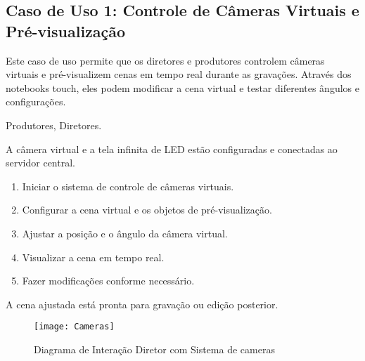 \subsection{Caso de Uso 1: Controle de Câmeras Virtuais e Pré-visualização}
\begin{description}[style=nextline]
    \item[Descrição:] Este caso de uso permite que os diretores e produtores controlem câmeras virtuais e pré-visualizem cenas em tempo real durante as gravações. Através dos notebooks touch, eles podem modificar a cena virtual e testar diferentes ângulos e configurações.
    
    \item[Atores:] Produtores, Diretores.
    
    \item[Pré-condição:] A câmera virtual e a tela infinita de LED estão configuradas e conectadas ao servidor central.
    
    \item[Sequência de Ações:]
    \begin{enumerate}
        \item Iniciar o sistema de controle de câmeras virtuais.
        \item Configurar a cena virtual e os objetos de pré-visualização.
        \item Ajustar a posição e o ângulo da câmera virtual.
        \item Visualizar a cena em tempo real.
        \item Fazer modificações conforme necessário.
    \end{enumerate}
    
    \item[Pós-condição:] A cena ajustada está pronta para gravação ou edição posterior.
\end{description}

\begin{figure}[ht]
    \centering
    \texttt{[image: Cameras]}
    \caption{Diagrama de Interação Diretor com Sistema de cameras}
    \label{fig:diagram1}
\end{figure}

